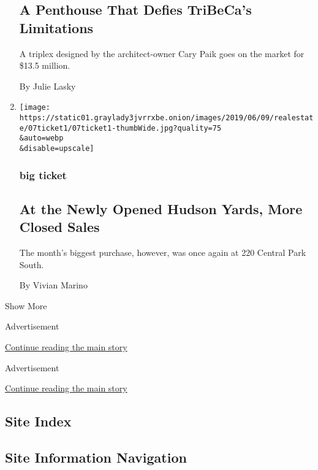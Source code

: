 \begin{enumerate}
  \hypertarget{a-penthouse-that-defies-tribecas-limitations}{%
  \subsection{A Penthouse That Defies TriBeCa's
  Limitations}\label{a-penthouse-that-defies-tribecas-limitations}}

  A triplex designed by the architect-owner Cary Paik goes on the market
  for \$13.5 million.

  By Julie Lasky
\item
  \href{/2019/06/07/realestate/at-the-newly-opened-hudson-yards-more-closed-sales.html}{}

  \texttt{[image: https://static01.graylady3jvrrxbe.onion/images/2019/06/09/realestate/07ticket1/07ticket1-thumbWide.jpg?quality=75\\\&auto=webp\\\&disable=upscale]}

  \hypertarget{big-ticket-2}{%
  \subsubsection{big ticket}\label{big-ticket-2}}

  \hypertarget{at-the-newly-opened-hudson-yards-more-closed-sales}{%
  \subsection{At the Newly Opened Hudson Yards, More Closed
  Sales}\label{at-the-newly-opened-hudson-yards-more-closed-sales}}

  The month's biggest purchase, however, was once again at 220 Central
  Park South.

  By Vivian Marino
\end{enumerate}

Show More

Advertisement

\protect\hyperlink{after-mid2}{Continue reading the main story}

Advertisement

\protect\hyperlink{after-mktg}{Continue reading the main story}

\hypertarget{site-index}{%
\subsection{Site Index}\label{site-index}}

\hypertarget{site-information-navigation}{%
\subsection{Site Information
Navigation}\label{site-information-navigation}}

